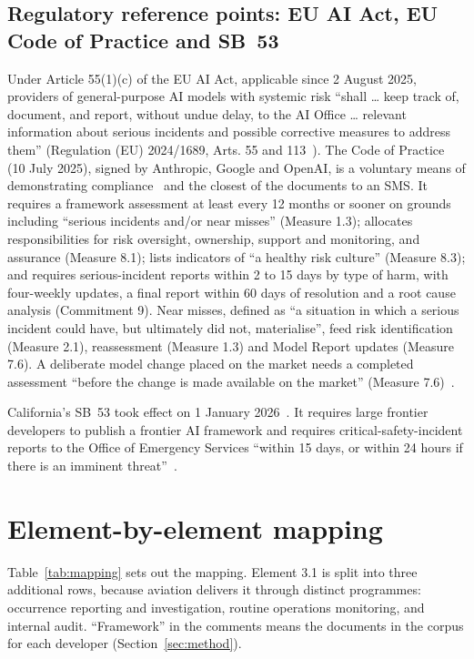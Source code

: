 \documentclass[11pt]{article}
\begin{document}
\subsection{Regulatory reference points: EU AI Act, EU Code of Practice and SB~53}\label{sec:regref}

Under Article 55(1)(c) of the EU AI Act, applicable since 2 August 2025, providers of general-purpose AI models with systemic risk ``shall \ldots{} keep track of, document, and report, without undue delay, to the AI Office \ldots{} relevant information about serious incidents and possible corrective measures to address them'' (Regulation (EU) 2024/1689, Arts. 55 and 113~\cite{reg2024_1689}). The Code of Practice (10 July 2025), signed by Anthropic, Google and OpenAI, is a voluntary means of demonstrating compliance~\cite{ecGPAIcodepage} and the closest of the documents to an SMS. It requires a framework assessment at least every 12 months or sooner on grounds including ``serious incidents and/or near misses'' (Measure 1.3); allocates responsibilities for risk oversight, ownership, support and monitoring, and assurance (Measure 8.1); lists indicators of ``a healthy risk culture'' (Measure 8.3); and requires serious-incident reports within 2 to 15 days by type of harm, with four-weekly updates, a final report within 60 days of resolution and a root cause analysis (Commitment 9). Near misses, defined as ``a situation in which a serious incident could have, but ultimately did not, materialise'', feed risk identification (Measure 2.1), reassessment (Measure 1.3) and Model Report updates (Measure 7.6). A deliberate model change placed on the market needs a completed assessment ``before the change is made available on the market'' (Measure 7.6)~\cite{ec2025code}.

California's SB~53 took effect on 1 January 2026~\cite{anthropic2025fcf}. It requires large frontier developers to publish a frontier AI framework and requires critical-safety-incident reports to the Office of Emergency Services ``within 15 days, or within 24 hours if there is an imminent threat''~\cite{casenate2025sb53}.

\section{Element-by-element mapping}\label{sec:mapping}

Table~\ref{tab:mapping} sets out the mapping. Element 3.1 is split into three additional rows, because aviation delivers it through distinct programmes: occurrence reporting and investigation, routine operations monitoring, and internal audit. ``Framework'' in the comments means the documents in the corpus for each developer (Section~\ref{sec:method}).
\end{document}
